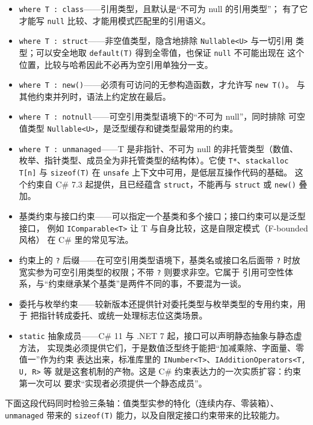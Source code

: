 \documentclass[12pt,a4paper,fontset=fandol]{ctexbook}
\newcommand{\kw}[1]{\texttt{#1}}
\begin{document}
\begin{itemize}
  \item \kw{where T : class}——引用类型，且默认是“不可为 null 的引用类型”；
        有了它才能写 \kw{null} 比较、才能用模式匹配里的引用语义。
  \item \kw{where T : struct}——非空值类型，隐含地排除 \kw{Nullable<U>} 与一切引用
        类型；可以安全地取 \kw{default(T)} 得到全零值，也保证 \kw{null} 不可能出现在
        这个位置，比较与哈希因此不必再为空引用单独分一支。
  \item \kw{where T : new()}——必须有可访问的无参构造函数，才允许写 \kw{new T()}。
        与其他约束并列时，语法上约定放在最后。
  \item \kw{where T : notnull}——可空引用类型语境下的“不可为 null”，同时排除
        可空值类型 \kw{Nullable<U>}，是泛型缓存和键类型最常用的约束。
  \item \kw{where T : unmanaged}——T 是非指针、不可为 null 的非托管类型（数值、
        枚举、指针类型、成员全为非托管类型的结构体）。它使 \kw{T*}、\kw{stackalloc T[n]}
        与 \kw{sizeof(T)} 在 \kw{unsafe} 上下文中可用，是低层互操作代码的基础。
        这个约束自 C\# 7.3 起提供，且已经蕴含 \kw{struct}，不能再与 \kw{struct}
        或 \kw{new()} 叠加。
  \item 基类约束与接口约束——可以指定一个基类和多个接口；接口约束可以是泛型接口，
        例如 \kw{IComparable<T>} 让 T 与自身比较，这是自限定模式（F-bounded 风格）
        在 C\# 里的常见写法。
  \item 约束上的 \kw{?} 后缀——在可空引用类型语境下，基类名或接口名后面带
        \kw{?} 时放宽实参为可空引用类型的权限；不带 \kw{?} 则要求非空。它属于
        引用可空性体系，与“约束继承某个基类”是两件不同的事，不要混为一谈。
  \item 委托与枚举约束——较新版本还提供针对委托类型与枚举类型的专用约束，用于
        把指针转成委托、或统一处理标志位这类场景。
  \item \kw{static} 抽象成员——C\# 11 与 .NET 7 起，接口可以声明静态抽象与静态虚方法，
        实现类必须提供它们，于是数值泛型终于能把“加减乘除、字面量、零值一”作为约束
        表达出来，标准库里的 \kw{INumber<T>}、\kw{IAdditionOperators<T, U, R>} 等
        就是这套机制的产物。这是 C\# 约束表达力的一次实质扩容：约束第一次可以
        要求“实现者必须提供一个静态成员”。
\end{itemize}

下面这段代码同时检验三条轴：值类型实参的特化（连续内存、零装箱）、
\kw{unmanaged} 带来的 \kw{sizeof(T)} 能力，以及自限定接口约束带来的比较能力。
\end{document}
